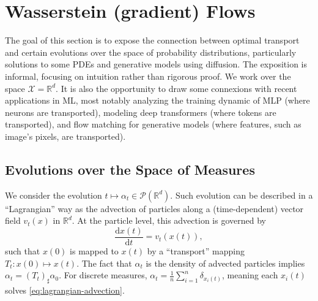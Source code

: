 
\section{Wasserstein (gradient) Flows}

The goal of this section is to expose the connection between optimal transport and certain evolutions over the space of probability distributions, particularly solutions to some PDEs and generative models using diffusion. The exposition is informal, focusing on intuition rather than rigorous proof. We work over the space $\mathcal{X} = \mathbb{R}^d$. It is also the opportunity to draw some connexions with recent applications in ML, most notably analyzing the training dynamic of MLP (where neurons are transported), modeling deep transformers (where tokens are transported), and flow matching for generative models (where features, such as image's pixels, are transported).

\subsection{Evolutions over the Space of Measures}

We consider the evolution $t \mapsto \alpha_t \in \mathcal{P}(\mathbb{R}^d)$. Such evolution can be described in a ``Lagrangian'' way as the advection of particles along a (time-dependent) vector field $v_t(x)$ in $\mathbb{R}^d$. At the particle level, this advection is governed by 
\begin{equation}
    \frac{\mathrm{d}x(t)}{\mathrm{d}t} = v_t(x(t)), \label{eq:lagrangian-advection}
\end{equation}
such that $x(0)$ is mapped to $x(t)$ by a ``transport'' mapping $T_t : x(0) \mapsto x(t)$. The fact that $\alpha_t$ is the density of advected particles implies $\alpha_t = (T_t)_\sharp \alpha_0$. For discrete measures, $\alpha_t = \frac{1}{n} \sum_{i=1}^n \delta_{x_i(t)}$, meaning each $x_i(t)$ solves \eqref{eq:lagrangian-advection}.

